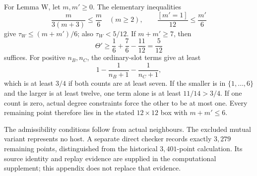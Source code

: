 For Lemma W, let $m,m'\ge0$. The elementary inequalities
\[
 \frac{m}{3(m+3)}\le\frac m6\quad(m\ge2),\qquad
 \frac{[m'=1]}{12}\le\frac{m'}6
\]
give $\tau_W\le(m+m')/6$; also $\tau_W<5/12$. If $m+m'\ge7$, then
\[
 \Theta'\ge\frac16+\frac76-\frac{11}{12}=\frac5{12}
\]
suffices. For positive $n_B,n_C$, the ordinary-slot terms give at least
\[
 1-\frac1{n_B+1}-\frac1{n_C+1},
\]
which is at least $3/4$ if both counts are at least seven. If the smaller is in $\{1,\ldots,6\}$ and the larger is at least twelve, one term alone is at least $11/14>3/4$. If one count is zero, actual degree constraints force the other to be at most one. Every remaining point therefore lies in the stated $12\times12$ box with $m+m'\le6$.

The admissibility conditions follow from actual neighbours. The excluded mutual variant represents no host. A separate direct checker records exactly $3{,}279$ remaining points, distinguished from the historical $3{,}401$-point calculation. Its source identity and replay evidence are supplied in the computational supplement; this appendix does not replace that evidence.
